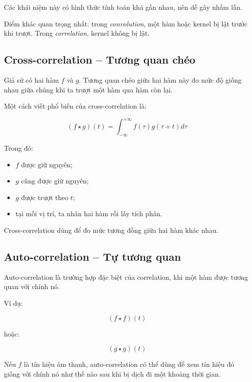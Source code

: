 Các khái niệm này có hình thức tính toán khá gần nhau, nên dễ gây nhầm lẫn.

\begin{ghinho}
Điểm khác quan trọng nhất: trong \textit{convolution}, một hàm hoặc kernel bị lật trước khi trượt. Trong \textit{correlation}, kernel không bị lật.
\end{ghinho}

\subsection{Cross-correlation -- Tương quan chéo}

Giả sử có hai hàm $f$ và $g$. Tương quan chéo giữa hai hàm này đo mức độ giống nhau giữa chúng khi ta trượt một hàm qua hàm còn lại.

Một cách viết phổ biến của cross-correlation là:

\[
    (f \star g)(t)
    =
    \int_{-\infty}^{+\infty}
    f(\tau)g(\tau+t)d\tau
\]

Trong đó:

\begin{itemize}
    \item $f$ được giữ nguyên;
    \item $g$ cũng được giữ nguyên;
    \item $g$ được trượt theo $t$;
    \item tại mỗi vị trí, ta nhân hai hàm rồi lấy tích phân.
\end{itemize}

\begin{ghinho}
Cross-correlation dùng để đo mức tương đồng giữa hai hàm khác nhau.
\end{ghinho}

\subsection{Auto-correlation -- Tự tương quan}

Auto-correlation là trường hợp đặc biệt của correlation, khi một hàm được tương quan với chính nó.

Ví dụ:

\[
    (f \star f)(t)
\]

hoặc:

\[
    (g \star g)(t)
\]

\begin{vidu}
Nếu $f$ là tín hiệu âm thanh, auto-correlation có thể dùng để xem tín hiệu đó giống với chính nó như thế nào sau khi bị dịch đi một khoảng thời gian.
\end{vidu}

